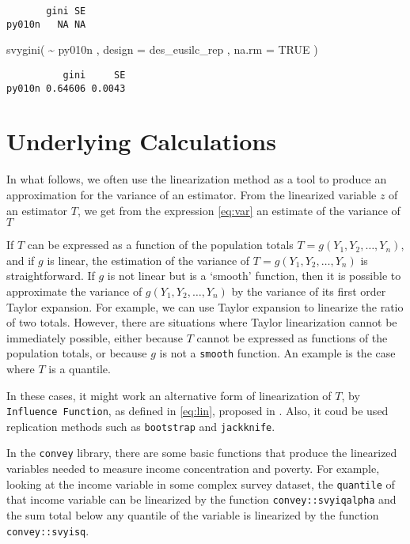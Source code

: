 \documentclass[
]{book}
\newenvironment{Shaded}{\begin{snugshade}}{\end{snugshade}}
\newcommand{\AttributeTok}[1]{\textcolor[rgb]{0.77,0.63,0.00}{#1}}
\newcommand{\ConstantTok}[1]{\textcolor[rgb]{0.00,0.00,0.00}{#1}}
\newcommand{\FunctionTok}[1]{\textcolor[rgb]{0.00,0.00,0.00}{#1}}
\newcommand{\NormalTok}[1]{#1}
\newcommand{\SpecialCharTok}[1]{\textcolor[rgb]{0.00,0.00,0.00}{#1}}
\begin{document}
\begin{verbatim}
       gini SE
py010n   NA NA
\end{verbatim}

\begin{Shaded}
\begin{Highlighting}[]
\FunctionTok{svygini}\NormalTok{( }\SpecialCharTok{\textasciitilde{}}\NormalTok{ py010n , }\AttributeTok{design =}\NormalTok{ des\_eusilc\_rep , }\AttributeTok{na.rm =} \ConstantTok{TRUE}\NormalTok{ )}
\end{Highlighting}
\end{Shaded}

\begin{verbatim}
          gini     SE
py010n 0.64606 0.0043
\end{verbatim}

\hypertarget{underlying-calculations}{%
\section{Underlying Calculations}\label{underlying-calculations}}

In what follows, we often use the linearization method as a tool to produce an approximation for the variance of an estimator. From the linearized variable \(z\) of an estimator \(T\), we get from the expression \eqref{eq:var} an estimate of the variance of \(T\)

If \(T\) can be expressed as a function of the population totals \(T = g(Y_1, Y_2, \ldots, Y_n)\), and if \(g\) is linear, the estimation of the variance of \(T = g(Y_1, Y_2, \ldots, Y_n)\) is straightforward. If \(g\) is not linear but is a `smooth' function, then it is possible to approximate the variance of \(g(Y_1, Y_2, \ldots, Y_n)\) by the variance of its first order Taylor expansion. For example, we can use Taylor expansion to linearize the ratio of two totals. However, there are situations where Taylor linearization cannot be immediately possible, either because \(T\) cannot be expressed as functions of the population totals, or because \(g\) is not a \texttt{smooth} function. An example is the case where \(T\) is a quantile.

In these cases, it might work an alternative form of linearization of \(T\), by \texttt{Influence\ Function}, as defined in \eqref{eq:lin}, proposed in \textcite{deville1999}. Also, it coud be used replication methods such as \texttt{bootstrap} and \texttt{jackknife}.

In the \texttt{convey} library, there are some basic functions that produce the linearized variables needed to measure income concentration and poverty. For example, looking at the income variable in some complex survey dataset, the \texttt{quantile} of that income variable can be linearized by the function \texttt{convey::svyiqalpha} and the sum total below any quantile of the variable is linearized by the function \texttt{convey::svyisq}.
\end{document}
